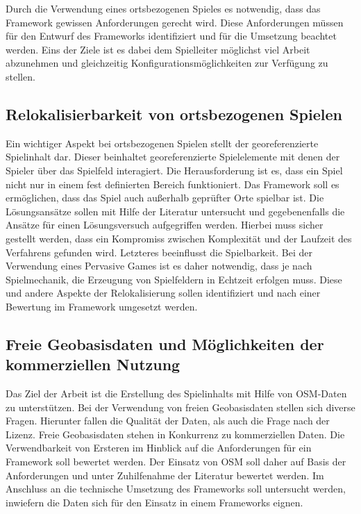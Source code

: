 Durch die Verwendung eines ortsbezogenen Spieles es notwendig, dass das Framework gewissen Anforderungen gerecht wird.
Diese Anforderungen müssen für den Entwurf des Frameworks identifiziert und für die Umsetzung beachtet werden.
Eins der Ziele ist es dabei dem Spielleiter möglichst viel Arbeit abzunehmen und gleichzeitig Konfigurationsmöglichkeiten zur Verfügung zu stellen.

\subsection*{Relokalisierbarkeit von ortsbezogenen Spielen}

Ein wichtiger Aspekt bei ortsbezogenen Spielen stellt der georeferenzierte Spielinhalt dar. Dieser beinhaltet georeferenzierte Spielelemente mit denen der Spieler über das Spielfeld interagiert.
Die Herausforderung ist es, dass ein Spiel nicht nur in einem fest definierten Bereich funktioniert. Das Framework soll es ermöglichen, dass das Spiel auch außerhalb geprüfter Orte spielbar ist.
Die Lösungsansätze sollen mit Hilfe der Literatur untersucht und gegebenenfalls die Ansätze für einen Lösungsversuch aufgegriffen werden.
Hierbei muss sicher gestellt werden, dass ein Kompromiss zwischen Komplexität und der Laufzeit des Verfahrens gefunden wird. Letzteres beeinflusst die Spielbarkeit.
Bei der Verwendung eines Pervasive Games ist es daher notwendig, dass je nach Spielmechanik, die Erzeugung von Spielfeldern in Echtzeit erfolgen muss.
Diese und andere Aspekte der Relokalisierung sollen identifiziert und nach einer Bewertung im Framework umgesetzt werden.

\subsection*{Freie Geobasisdaten und Möglichkeiten der kommerziellen Nutzung}

Das Ziel der Arbeit ist die Erstellung des Spielinhalts mit Hilfe von OSM-Daten zu unterstützen.
Bei der Verwendung von freien Geobasisdaten stellen sich diverse Fragen. Hierunter fallen die Qualität der Daten, als auch die Frage nach der Lizenz.
Freie Geobasisdaten stehen in Konkurrenz zu kommerziellen Daten. Die Verwendbarkeit von Ersteren im Hinblick auf die Anforderungen für ein Framework soll bewertet werden.
Der Einsatz von OSM soll daher auf Basis der Anforderungen und unter Zuhilfenahme der Literatur bewertet werden. Im Anschluss an die technische Umsetzung des Frameworks soll untersucht werden, inwiefern die Daten sich für den Einsatz in einem Frameworks eignen.
